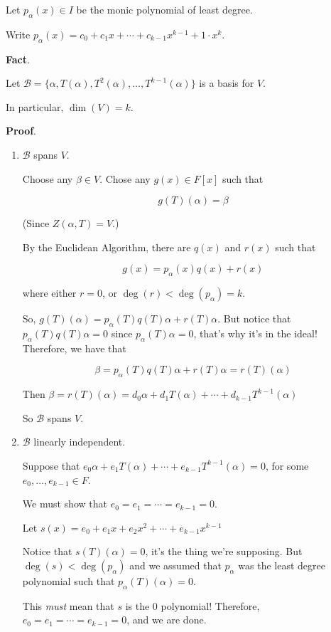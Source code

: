 \documentclass[12pt]{article}
\def\B{\mathcal B}
\begin{document}
  Let $p_\alpha(x) \in I$ be the monic polynomial of least degree.

  Write $p_\alpha(x) = c_0 + c_1 x + \cdots + c_{k - 1} x^{k - 1} + 1 \cdot x^k$.

  {\bf Fact}.

  Let $\B = \{\alpha, T(\alpha), T^2(\alpha), \dots, T^{k - 1}(\alpha)\}$ is a
  basis for $V$.

  In particular, $\dim(V) = k$.

  {\bf Proof}.

  \begin{enumerate}
    \item $\B$ spans $V$.

      Choose any $\beta \in V$. Chose any $g(x) \in F[x]$ such that

      \[
        g(T)(\alpha) = \beta
      \]

      (Since $Z(\alpha, T) = V$.)

      By the Euclidean Algorithm, there are $q(x)$ and $r(x)$ such that

      \[
        g(x) = p_\alpha(x) q(x) + r(x)
      \]

      where either $r = 0$, or $\deg(r) < \deg(p_\alpha) = k$.

      So, $g(T)(\alpha) = p_\alpha(T) q(T) \alpha + r(T) \alpha$. But notice
      that $p_\alpha(T) q(T) \alpha = 0$ since $p_\alpha(T) \alpha = 0$, that's
      why it's in the ideal! Therefore, we have that

      \[
        \beta = p_\alpha(T) q(T) \alpha + r(T) \alpha = r(T)(\alpha)
      \]

      Then $\beta = r(T)(\alpha) = d_0 \alpha + d_1 T(\alpha) + \cdots + d_{k -
      1} T^{k - 1}(\alpha)$

      So $\B$ spans $V$.

    \item $\B$ linearly independent.

      Suppose that $e_0 \alpha + e_1 T(\alpha) + \cdots + e_{k - 1} T^{k - 1}
      (\alpha) = 0$, for some $e_0, \dots, e_{k - 1} \in F$.

      We must show that $e_0 = e_1 = \cdots = e_{k - 1} = 0$.

      Let $s(x) = e_0 + e_1 x + e_2 x^2 + \cdots + e_{k - 1} x^{k - 1}$

      Notice that $s(T)(\alpha) = 0$, it's the thing we're supposing. But
      $\deg(s) < \deg(p_\alpha)$ and we assumed that $p_\alpha$ was the least
      degree polynomial such that $p_\alpha(T)(\alpha) = 0$.

      This {\it must} mean that $s$ is the 0 polynomial! Therefore, $e_0 = e_1 =
      \cdots = e_{k - 1} = 0$, and we are done.
  \end{enumerate}
\end{document}

